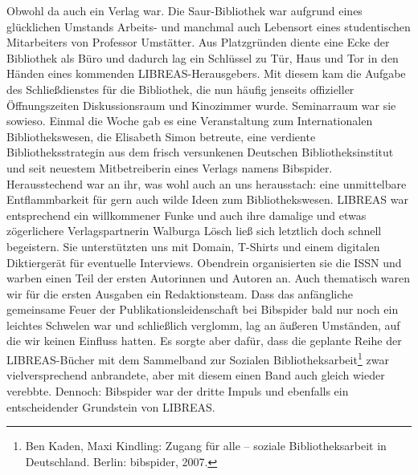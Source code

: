 \documentclass[output=paper]{langsci/langscibook}
\begin{document}
Obwohl da auch ein Verlag war. Die Saur-Bibliothek war aufgrund eines
glücklichen Umstands Arbeits- und manchmal auch Lebensort eines
studentischen Mitarbeiters von Professor Umstätter. Aus Platzgründen
diente eine Ecke der Bibliothek als Büro und dadurch lag ein Schlüssel
zu Tür, Haus und Tor in den Händen eines kommenden LIBREAS-Herausgebers.
Mit diesem kam die Aufgabe des Schließdienstes für die Bibliothek, die
nun häufig jenseits offizieller Öffnungszeiten Diskussionsraum und
Kinozimmer wurde. Seminarraum war sie sowieso. Einmal die Woche gab es
eine Veranstaltung zum Internationalen Bibliothekswesen, die Elisabeth
Simon betreute, eine verdiente Bibliotheksstrategin aus dem frisch
versunkenen Deutschen Bibliotheksinstitut und seit neuestem
Mitbetreiberin eines Verlags namens Bibspider. Herausstechend war an
ihr, was wohl auch an uns herausstach: eine unmittelbare Entflammbarkeit
für gern auch wilde Ideen zum Bibliothekswesen. LIBREAS war entsprechend
ein willkommener Funke und auch ihre damalige und etwas zögerlichere
Verlagspartnerin Walburga Lösch ließ sich letztlich doch schnell
begeistern. Sie unterstützten uns mit Domain, T-Shirts und einem
digitalen Diktiergerät für eventuelle Interviews. Obendrein
organisierten sie die ISSN und warben einen Teil der ersten Autorinnen
und Autoren an. Auch thematisch waren wir für die ersten Ausgaben ein
Redaktionsteam. Dass das anfängliche gemeinsame Feuer der
Publikationsleidenschaft bei Bibspider bald nur noch ein leichtes
Schwelen war und schließlich verglomm, lag an äußeren Umständen, auf die
wir keinen Einfluss hatten. Es sorgte aber dafür, dass die geplante
Reihe der LIBREAS-Bücher mit dem Sammelband zur Sozialen
Bibliotheksarbeit\footnote{Ben Kaden, Maxi Kindling: Zugang für alle --
  soziale Bibliotheksarbeit in Deutschland. Berlin: bibspider, 2007.}
zwar vielversprechend anbrandete, aber mit diesem einen Band auch gleich
wieder verebbte. Dennoch: Bibspider war der dritte Impuls und ebenfalls
ein entscheidender Grundstein von LIBREAS.
\end{document}

